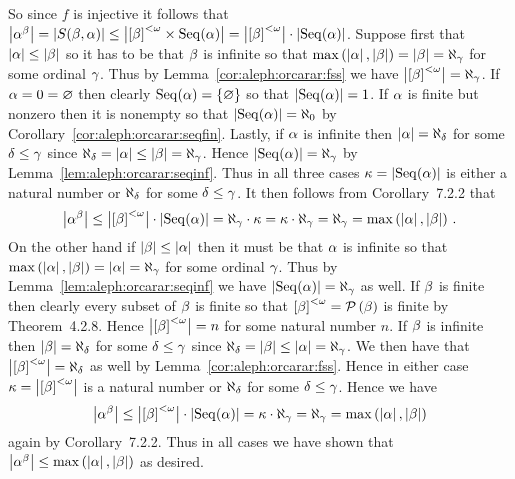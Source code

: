 {{    So since $f$ is injective it follows that $\abs{\a^\b} = \abs{\sba} \leq \abs{\bfs \times \Seq(\a)} = \abs{\bfs} \cdot \abs{\Seq(\a)}$.
    Suppose first that $\abs{\a} \leq \abs{\b}$ so it has to be that $\b$ is infinite so that $\maxab = \abs{\b} = \al_\g$ for some ordinal $\g$.
    Thus by Lemma~\ref{cor:aleph:orcarar:fss} we have $\abs{\bfs} = \al_\g$.
    If $\a = 0 = \es$ then clearly $\Seq(\a) = \braces{\es}$ so that $\abs{\Seq(\a)} = 1$.
    If $\a$ is finite but nonzero then it is nonempty so that $\abs{\Seq(\a)} = \al_0$ by Corollary~\ref{cor:aleph:orcarar:seqfin}.       Lastly, if $\a$ is infinite then $\abs{\a} = \al_\d$ for some $\d \leq \g$ since $\al_\d = \abs{\a} \leq \abs{\b} = \al_\g$.
    Hence $\abs{\Seq(\a)} = \al_\g$ by Lemma~\ref{lem:aleph:orcarar:seqinf}.
    Thus in all three cases $\k = \abs{\Seq(\a)}$ is either a natural number or $\al_\d$ for some $\d \leq \g$.
    It then follows from Corollary~7.2.2 that
    $$
    \abs{\a^\b} \leq \abs{\bfs} \cdot \abs{\Seq(\a)} = \al_\g \cdot \k = \k \cdot \al_\g = \al_\g = \maxab \,.
    $$
    On the other hand if $\abs{\b} \leq \abs{\a}$ then it must be that $\a$ is infinite so that $\maxab = \abs{\a} = \al_\g$ for some ordinal $\g$.
    Thus by Lemma~\ref{lem:aleph:orcarar:seqinf} we have $\abs{\Seq(\a)} = \al_\g$ as well.
    If $\b$ is finite then clearly every subset of $\b$ is finite so that $\bfs = \pset{\b}$ is finite by Theorem~4.2.8.
    Hence $\abs{\bfs} = n$ for some natural number $n$.
    If $\b$ is infinite then $\abs{\b} = \al_\d$ for some $\d \leq \g$ since $\al_\d = \abs{\b} \leq \abs{\a} = \al_\g$.
    We then have that $\abs{\bfs} = \al_\d$ as well by Lemma~\ref{cor:aleph:orcarar:fss}.
    Hence in either case $\k = \abs{\bfs}$ is a natural number or $\al_\d$ for some $\d \leq \g$.
    Hence we have
    $$
    \abs{\a^\b} \leq \abs{\bfs} \cdot \abs{\Seq(\a)} = \k \cdot \al_\g = \al_\g = \maxab
    $$
    again by Corollary~7.2.2.
    Thus in all cases we have shown that $\abs{\a^\b} \leq \maxab$ as desired.
  }

  \mainprob
  }
